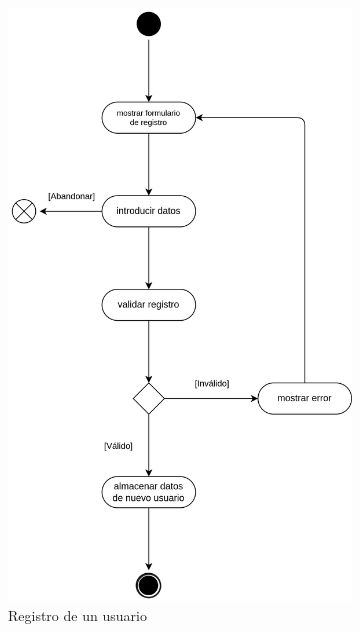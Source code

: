             \begin{figure}[h]
                \centering

                \begin{subfigure}{0.45\textwidth}
                    \centering
                    \includegraphics[scale=0.15]{images/Diagramas/Actividades y transiciones 1.png}
                    \caption{Registro de un usuario}
                    \label{fig:registro-usuario}
                \end{subfigure}
                \hfill
                \begin{subfigure}{0.45\textwidth}

\end{subfigure}
\end{figure}

